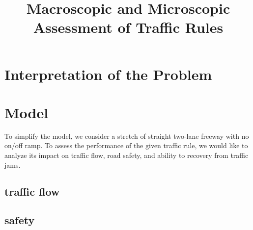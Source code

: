 \documentclass[aps,prl,superscriptaddress,12pt]{revtex4-1}
\begin{document}
	\title{Macroscopic and Microscopic Assessment of Traffic Rules }
		
	\begin{abstract}
		
	\end{abstract}
	
\maketitle

	\section{Interpretation of the Problem}


	\section{Model}
	To simplify the model, we consider a stretch of straight two-lane freeway with no on/off ramp. To assess the performance of the given traffic rule, we would like to analyze its impact on traffic flow, road safety, and ability to recovery from traffic jams.
	\subsection{traffic flow} 
	
	\subsection{safety}
	
\end{document}
